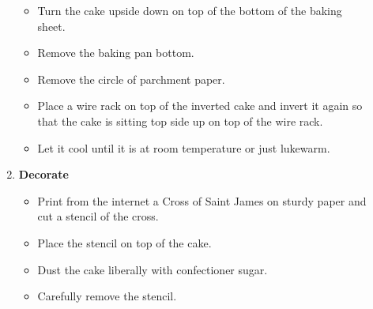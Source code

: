 \documentclass[11pt,letterpaper]{article}
\begin{document}
\begin{description}
\begin{enumerate}
\begin{itemize}
	\item Turn the cake upside down on top of the bottom of the baking sheet.
	\item Remove the baking pan bottom.
	\item Remove the circle of parchment paper.
	\item Place a wire rack on top of the inverted cake and invert it again so that the cake is sitting top side up on top of the wire rack.
	\item Let it cool until it is at room temperature or just lukewarm.
	\end{itemize}
	\item {\bf Decorate}
	\begin{itemize}
	\item Print from the internet a Cross of Saint James on sturdy paper and cut a stencil of the cross.
	\item Place the stencil on top of the cake.
	\item Dust the cake liberally with confectioner sugar.
	\item Carefully remove the stencil.
	\end{itemize}
	\end{enumerate}

\end{description}
\end{document}
